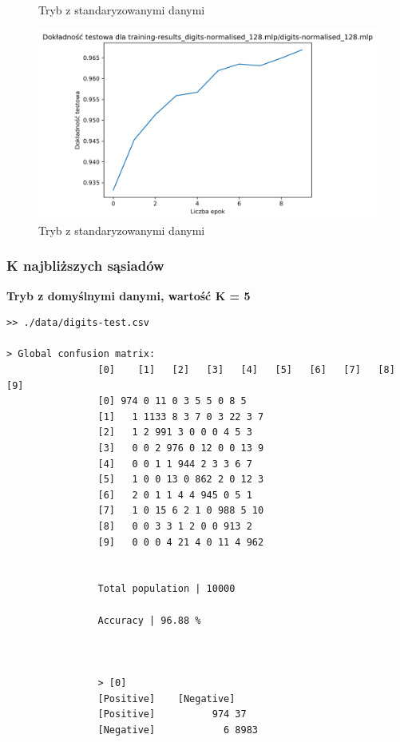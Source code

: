 \documentclass{classrep}
\begin{document}
{{{\begin{figure}[!htbp]
                    \caption{Tryb z standaryzowanymi danymi}
                \end{figure}
                \begin{figure}[!htbp]
                    \centering
                    \includegraphics[width=165mm]{wykresy/digits-normalised_128_mlp_testing-accuracy.png}
                    \caption{Tryb z standaryzowanymi danymi}
                \end{figure}
                \FloatBarrier
            }
            \subsubsection{K najbliższych sąsiadów}
            {
                \textbf{Tryb z domyślnymi danymi, wartość K = 5}
                \begin{lstlisting}
>> ./data/digits-test.csv

> Global confusion matrix:
                [0]    [1]   [2]   [3]   [4]   [5]   [6]   [7]   [8]  [9]
                [0] 974 0 11 0 3 5 5 0 8 5
                [1]   1 1133 8 3 7 0 3 22 3 7
                [2]   1 2 991 3 0 0 0 4 5 3
                [3]   0 0 2 976 0 12 0 0 13 9
                [4]   0 0 1 1 944 2 3 3 6 7
                [5]   1 0 0 13 0 862 2 0 12 3
                [6]   2 0 1 1 4 4 945 0 5 1
                [7]   1 0 15 6 2 1 0 988 5 10
                [8]   0 0 3 3 1 2 0 0 913 2
                [9]   0 0 0 4 21 4 0 11 4 962


                Total population | 10000

                Accuracy | 96.88 %



                > [0]
                [Positive]    [Negative]
                [Positive]          974 37
                [Negative]            6 8983



\end{lstlisting}}}}
\end{document}
